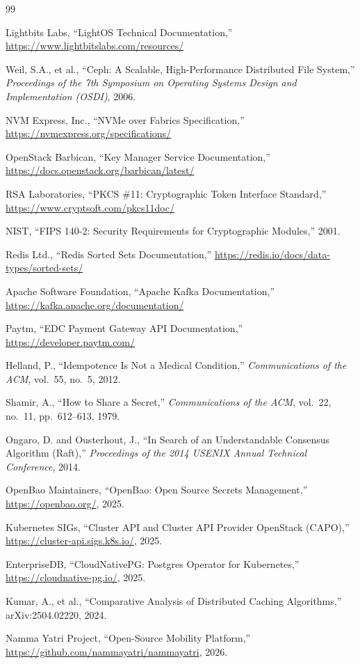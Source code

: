 \documentclass[12pt,a4paper,oneside]{report}
\begin{document}
\begin{thebibliography}{99}

Lightbits Labs, ``LightOS Technical Documentation,''
\url{https://www.lightbitslabs.com/resources/}

Weil, S.A., et al.,
``Ceph: A Scalable, High-Performance Distributed File System,''
\textit{Proceedings of the 7th Symposium on Operating Systems Design and Implementation (OSDI)}, 2006.

NVM Express, Inc.,
``NVMe over Fabrics Specification,''
\url{https://nvmexpress.org/specifications/}

OpenStack Barbican,
``Key Manager Service Documentation,''
\url{https://docs.openstack.org/barbican/latest/}

RSA Laboratories,
``PKCS \#11: Cryptographic Token Interface Standard,''
\url{https://www.cryptsoft.com/pkcs11doc/}

NIST,
``FIPS 140-2: Security Requirements for Cryptographic Modules,''
2001.

Redis Ltd.,
``Redis Sorted Sets Documentation,''
\url{https://redis.io/docs/data-types/sorted-sets/}

Apache Software Foundation,
``Apache Kafka Documentation,''
\url{https://kafka.apache.org/documentation/}

Paytm,
``EDC Payment Gateway API Documentation,''
\url{https://developer.paytm.com/}

Helland, P.,
``Idempotence Is Not a Medical Condition,''
\textit{Communications of the ACM}, vol.\ 55, no.\ 5, 2012.

Shamir, A.,
``How to Share a Secret,''
\textit{Communications of the ACM}, vol.\ 22, no.\ 11, pp.\ 612--613, 1979.

Ongaro, D. and Ousterhout, J.,
``In Search of an Understandable Consensus Algorithm (Raft),''
\textit{Proceedings of the 2014 USENIX Annual Technical Conference}, 2014.

OpenBao Maintainers,
``OpenBao: Open Source Secrets Management,''
\url{https://openbao.org/}, 2025.

Kubernetes SIGs,
``Cluster API and Cluster API Provider OpenStack (CAPO),''
\url{https://cluster-api.sigs.k8s.io/}, 2025.

EnterpriseDB,
``CloudNativePG: Postgres Operator for Kubernetes,''
\url{https://cloudnative-pg.io/}, 2025.

Kumar, A., et al.,
``Comparative Analysis of Distributed Caching Algorithms,''
arXiv:2504.02220, 2024.

Namma Yatri Project,
``Open-Source Mobility Platform,''
\url{https://github.com/nammayatri/nammayatri}, 2026.

\end{thebibliography}
\end{document}
